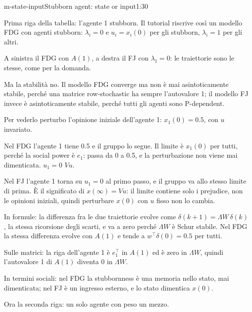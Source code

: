 \begin{slidedue}{m-state-input}{Stubborn agent: state or input}{1:30 {\color{red}}}
  \begin{discorso}
    \item Prima riga della tabella: l'agente 1 stubborn. Il tutorial riscrive così un modello FDG con agenti stubborn: $\lambda_i=0$ e $u_i=x_i(0)$ per gli stubborn, $\lambda_i=1$ per gli altri.
    \item A sinistra il FDG con $A(1)$, a destra il FJ con $\lambda_1=0$: le traiettorie sono le stesse, come per la domanda.
    \item Ma la stabilità no. Il modello FDG converge ma non è mai asintoticamente stabile, perché una matrice row-stochastic ha sempre l'autovalore 1; il modello FJ invece è asintoticamente stabile, perché tutti gli agenti sono P-dependent.
    \item \clic Per vederlo perturbo l'opinione iniziale dell'agente 1: $x_1(0)=0.5$, con $u$ invariato.
    \item Nel FDG l'agente 1 tiene 0.5 e il gruppo lo {\color{red}} {\color{blue}segue. Il limite è $x_1(0)$ per tutti, perché la social power è $e_1$: passa da 0 a 0.5, e} la perturbazione non viene mai dimenticata. {\color{red}     } {\color{red}$u_1=0$} {\color{red}        } {\color{red}$Vu$.}
    \item {\color{blue}Nel FJ l'agente 1 torna su $u_1=0$ al primo passo, e il gruppo va allo stesso limite di prima. È il significato di $x(\infty)=Vu$: il limite contiene solo i prejudice, non le opinioni iniziali, quindi perturbare $x(0)$ con $u$ fisso non lo cambia.}
    \item {\color{blue}In formule: la differenza fra le due traiettorie evolve come $\delta(k+1)=\Lambda W\,\delta(k)$, la stessa ricorsione degli scarti, e va a zero perché $\Lambda W$ è Schur stabile. Nel FDG la stessa differenza evolve con $A(1)$ e tende a $w^\top\delta(0)=0.5$ per tutti.}
    \item Sulle matrici: la riga dell'agente 1 è $e_1^\top$ in $A(1)$ ed è zero in $\Lambda W$, quindi l'autovalore 1 di $A(1)$ diventa 0 in $\Lambda W$.
    \item In termini sociali: nel FDG la stubbornness è una memoria nello stato, mai dimenticata; nel FJ è un ingresso esterno, e lo stato dimentica $x(0)$.
    \item Ora la seconda riga: un solo agente con peso un mezzo.
  \end{discorso}
\end{slidedue}

